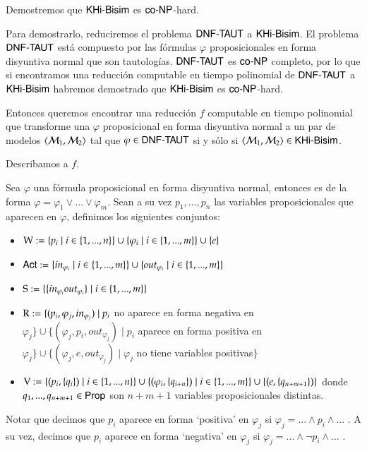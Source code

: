 \begin{demostracion}

    Demostremos que $\KHiBisim$ es $\coNP$-hard.

    Para demostrarlo, reduciremos el problema $\DNFTAUT$ a $\KHiBisim$. El problema $\DNFTAUT$ está compuesto por las fórmulas $\varphi$ proposicionales en forma disyuntiva normal que son tautologías. $\DNFTAUT$ es $\coNP$ completo, por lo que si encontramos una reducción computable en tiempo polinomial de $\DNFTAUT$ a $\KHiBisim$ habremos demostrado que $\KHiBisim$ es $\coNP$-hard.

    Entonces queremos encontrar una reducción $f$ computable en tiempo polinomial que transforme una $\varphi$ proposicional en forma disyuntiva normal a un par de modelos $\tup{\modults_1,\modults_2}$ tal que $\varphi \in \DNFTAUT$ si y sólo si $\tup{\modults_1,\modults_2} \in \KHiBisim$.

    Describamos a $f$.

    Sea $\varphi$ una fórmula proposicional en forma disyuntiva normal, entonces es de la forma $\varphi = \varphi_1 \vee ... \vee \varphi_m$. Sean a su vez $p_1,...,p_n$ las variables proposicionales que aparecen en $\varphi$, definimos los siguientes conjuntos:

    \begin{itemize}
        \item $\W := \{p_i\mid i\in\{1,...,n\}\} \cup \{\varphi_i \mid i \in \{1,...,m\}\} \cup \{e\}$
        \item $\ACT := \{in_{\varphi_i} \mid i \in \{1,...,m\}\} \cup \{out_{\varphi_i} \mid i \in \{1,...,m\}\}$
        \item $\S := \{\{in_{\varphi_i}out_{\varphi_i}\} \mid i \in \{1,...,m\}\}$
        \item $\R := \{(p_i,\varphi_j,in_{\varphi_j}) \mid p_i$ no aparece en forma negativa en $\varphi_j\} \cup \{(\varphi_j,p_i,out_{\varphi_j})\mid p_i$ aparece en forma positiva en $\varphi_j\} \cup \{(\varphi_j,e,out_{\varphi_j}) \mid \varphi_j$ no tiene variables positivas$\}$
        \item $\V := \{(p_i,\{q_i\}) \mid i \in \{1,...,n\}\} \cup \{(\varphi_i,\{q_{i+n}\}) \mid i \in \{1,...,m\}\} \cup \{(e,\{q_{n+m+1}\})\}$ donde $q_1,...,q_{n+m+1} \in \PROP$ son $n+m+1$ variables proposicionales distintas.
    \end{itemize}

    Notar que decimos que $p_i$ aparece en forma `positiva' en $\varphi_j$ si $\varphi_j = ... \wedge p_i \wedge...$ . A su vez, decimos que $p_i$ aparece en forma `negativa' en $\varphi_j$ si $\varphi_j = ...\wedge \neg p_i \wedge...$ .


\end{demostracion}
